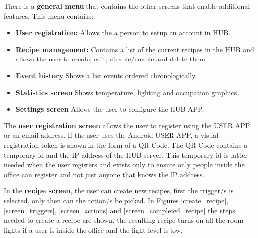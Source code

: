 There is a \textbf{general menu} that contains the other screens that enable additional features. This menu contains:
\begin{itemize}
  \item \textbf{User registration:} Allows the a person to setup an account in HUB. 
  \item \textbf{Recipe management:} Contains a list of the current recipes in the HUB and allows the user to create, edit, disable/enable and delete them.
  
  \item \textbf{Event history} Shows a list events ordered chronologically. 
  
  \item \textbf{Statistics screen} Shows temperature, lighting and occupation graphics. 
  
  \item \textbf{Settings screen} Allows the user to configure the HUB APP.
\end{itemize}



The \textbf{user registration screen} allows the user to register using the USER APP or an email address.
If the user uses the Android USER APP, a visual registration token is shown in the form of a QR-Code. The QR-Code contains a temporary id and the IP address of the HUB server. This temporary id is latter needed when the user registers and exists  only to ensure only people inside the office can register and not just anyone that knows the IP address.

In the \textbf{recipe screen}, the user can create new recipes, first the trigger/s is selected, only then can the action/s be picked. In Figures \ref{create_recipe}, \ref{screen_triggers}, \ref{screen_actions} and \ref{screen_completed_recipe} the steps needed to create a recipe are shown, the resulting recipe turns on all the room lights if a user is inside the office and the light level is low. 

